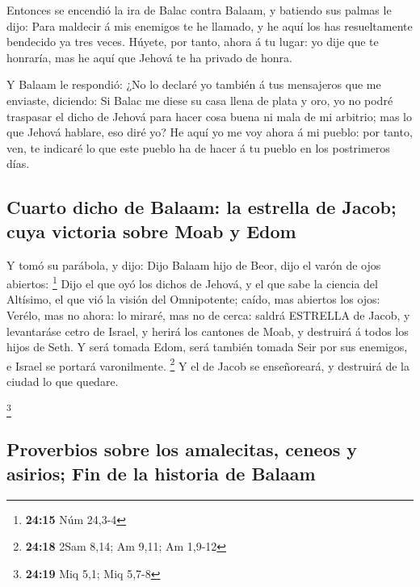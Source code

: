  Entonces se encendió la ira de Balac contra Balaam, y
batiendo sus palmas le dijo: Para maldecir á mis enemigos te he llamado,
y he aquí los has resueltamente bendecido ya tres veces. 
Húyete, por tanto, ahora á tu lugar: yo dije que te honraría, mas he
aquí que Jehová te ha privado de honra.

 Y Balaam le respondió: ¿No lo declaré yo también á tus
mensajeros que me enviaste, diciendo:  Si Balac me diese
su casa llena de plata y oro, yo no podré traspasar el dicho de Jehová
para hacer cosa buena ni mala de mi arbitrio; mas lo que Jehová hablare,
eso diré yo?  He aquí yo me voy ahora á mi pueblo: por
tanto, ven, te indicaré lo que este pueblo ha de hacer á tu pueblo en
los postrimeros días.

\hypertarget{cuarto-dicho-de-balaam-la-estrella-de-jacob-cuya-victoria-sobre-moab-y-edom}{%
\subsection{Cuarto dicho de Balaam: la estrella de Jacob; cuya victoria
sobre Moab y
Edom}\label{cuarto-dicho-de-balaam-la-estrella-de-jacob-cuya-victoria-sobre-moab-y-edom}}

 Y tomó su parábola, y dijo: Dijo Balaam hijo de Beor,
dijo el varón de ojos abiertos: \footnote{\textbf{24:15} Núm 24,3-4}
 Dijo el que oyó los dichos de Jehová, y el que sabe la
ciencia del Altísimo, el que vió la visión del Omnipotente; caído, mas
abiertos los ojos:  Verélo, mas no ahora: lo miraré, mas
no de cerca: saldrá ESTRELLA de Jacob, y levantaráse cetro de Israel, y
herirá los cantones de Moab, y destruirá á todos los hijos de Seth.
 Y será tomada Edom, será también tomada Seir por sus
enemigos, e Israel se portará varonilmente. \footnote{\textbf{24:18}
  2Sam 8,14; Am 9,11; Am 1,9-12}  Y el de Jacob se
enseñoreará, y destruirá de la ciudad lo que quedare.

\footnote{\textbf{24:19} Miq 5,1; Miq 5,7-8}

\hypertarget{proverbios-sobre-los-amalecitas-ceneos-y-asirios-fin-de-la-historia-de-balaam}{%
\subsection{Proverbios sobre los amalecitas, ceneos y asirios; Fin de la
historia de
Balaam}\label{proverbios-sobre-los-amalecitas-ceneos-y-asirios-fin-de-la-historia-de-balaam}}


